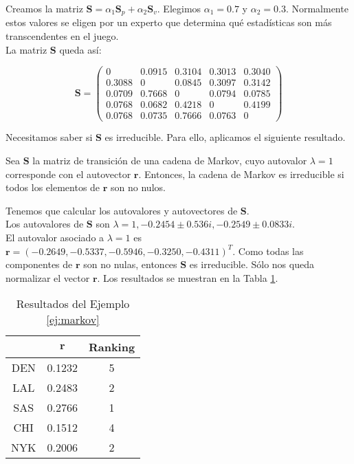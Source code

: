 \begin{ejemplo}
Creamos la matriz $\mathbf{S} = \alpha_1 \mathbf{S}_p + \alpha_2 \mathbf{S}_v$. Elegimos $\alpha_1 = 0.7$ y $\alpha_2 = 0.3$. Normalmente estos valores se eligen por un experto que determina qué estadísticas son más transcendentes en el juego.\\

La matriz $\mathbf{S}$ queda así:

\[ \mathbf{S} = \left(\begin{array}{rrrrr}
0      & 0.0915 & 0.3104 & 0.3013 & 0.3040 \\
0.3088 & 0      & 0.0845 & 0.3097 & 0.3142 \\
0.0709 & 0.7668 & 0      & 0.0794 & 0.0785 \\
0.0768 & 0.0682 & 0.4218 & 0      & 0.4199 \\
0.0768 & 0.0735 & 0.7666 & 0.0763 & 0

\end{array}\right) \]

Necesitamos saber si $\mathbf{S}$ es irreducible. Para ello, aplicamos el siguiente resultado.\\

\begin{prop}
Sea $\mathbf{S}$ la matriz de transición de una cadena de Markov, cuyo autovalor $\lambda = 1$ corresponde con el autovector $\mathbf{r}$. Entonces, la cadena de Markov es irreducible si todos los elementos de $\mathbf{r}$ son no nulos.
\end{prop}


Tenemos que calcular los autovalores y autovectores de $\mathbf{S}$.\\

Los autovalores de $\mathbf{S}$ son $\lambda = 1, -0.2454 \pm 0.536i, -0.2549 \pm 0.0833i$.\\
El autovalor asociado a $\lambda = 1$ es $\mathbf{r} = (-0.2649, -0.5337, -0.5946, -0.3250, -0.4311)^T$. Como todas las componentes de $\mathbf{r}$ son no nulas, entonces $\mathbf{S}$ es irreducible. Sólo nos queda normalizar el vector $\mathbf{r}$. Los resultados se muestran en la Tabla \ref{tbl:markov_resultados}. 

\begin{table}[h]
\centering
\caption{Resultados del Ejemplo \ref{ej:markov}}
\label{tbl:markov_resultados}
\begin{tabular}{@{}ccc@{}}
\cmidrule(l){2-3}
    & $\mathbf{r}$ & Ranking \\ \midrule
DEN & 0.1232       & 5       \\
LAL & 0.2483       & 2       \\
SAS & 0.2766       & 1       \\
CHI & 0.1512       & 4       \\
NYK & 0.2006       & 2       \\ \bottomrule
\end{tabular}
\end{table}

\end{ejemplo}

